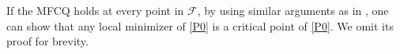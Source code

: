 \documentclass[10pt]{article}
\numberwithin{equation}{section}
\def\R{{\rm I\!R}}
\begin{document}
If the MFCQ holds at every point in $\mathcal{F}$, by using similar arguments as in \cite[Section~2]{YuLP20}, one can show that any local minimizer of \eqref{P0} is a {\color{black}critical point} of \eqref{P0}. We omit its proof for brevity.
\end{document}
